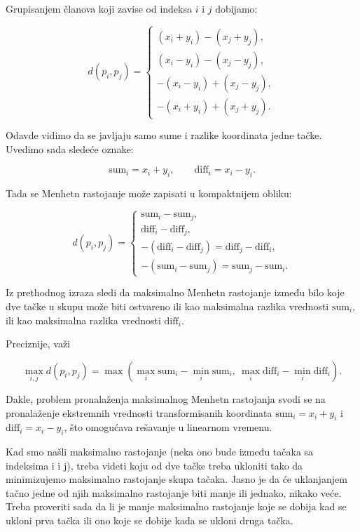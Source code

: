 \documentclass{article}
\begin{document}
Grupisanjem članova koji zavise od indeksa $i$ i $j$ dobijamo:

\[
d(p_i,p_j) =
\begin{cases}
(x_i + y_i) - (x_j + y_j), \\
(x_i - y_i) - (x_j - y_j), \\
-(x_i - y_i) + (x_j - y_j), \\
-(x_i + y_i) + (x_j + y_j).
\end{cases}
\]

Odavde vidimo da se javljaju samo sume i razlike koordinata jedne tačke.
Uvedimo sada sledeće oznake:

\[
\text{sum}_i = x_i + y_i, \qquad
\text{diff}_i = x_i - y_i.
\]

Tada se Menhetn rastojanje može zapisati u kompaktnijem obliku:

\[
d(p_i,p_j) =
\begin{cases}
\text{sum}_i - \text{sum}_j, \\
\text{diff}_i - \text{diff}_j, \\
-(\text{diff}_i - \text{diff}_j) = \text{diff}_j - \text{diff}_i,  \\
-(\text{sum}_i - \text{sum}_j) = \text{sum}_j - \text{sum}_i.
\end{cases}
\]

Iz prethodnog izraza sledi da maksimalno Menhetn rastojanje između bilo koje dve tačke u skupu može biti ostvareno ili kao maksimalna razlika vrednosti $\text{sum}_i$, ili kao maksimalna razlika vrednosti $\text{diff}_i$.


Preciznije, važi

\[
\max_{i,j} d(p_i,p_j)
=
\max \left(
\max_i \text{sum}_i - \min_i \text{sum}_i,\ 
\max_i \text{diff}_i - \min_i \text{diff}_i
\right).
\]

Dakle, problem pronalaženja maksimalnog Menhetn rastojanja svodi se na pronalaženje ekstremnih vrednosti transformisanih koordinata $\text{sum}_i = x_i + y_i$ i $\text{diff}_i = x_i - y_i$, što omogućava rešavanje u linearnom vremenu.

Kad smo našli maksimalno rastojanje (neka ono bude između tačaka sa indeksima i i j), treba videti koju od dve tačke treba ukloniti tako da minimizujemo maksimalno rastojanje skupa tačaka. Jasno je da će uklanjanjem tačno jedne od njih maksimalno rastojanje biti manje ili jednako, nikako veće. Treba proveriti sada da li je manje maksimalno rastojanje koje se dobija kad se ukloni prva tačka ili ono koje se dobije kada se ukloni druga tačka.
\end{document}
